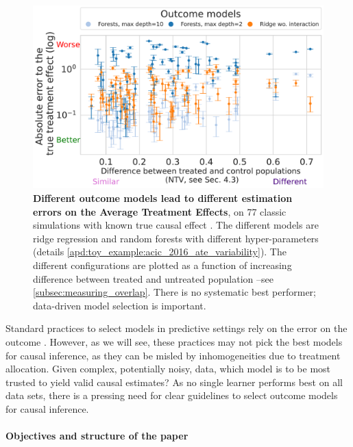 \documentclass[10pt]{article}
\begin{document}
\begin{multicols}{2}
    \begin{figure}
        \centering
        \includegraphics[width=0.95\linewidth]{images/2023-03-08-11-10-28_acic_2016_ate_heterogeneity.parquet_abs_bias_ylog_scale=True.pdf}%
        \caption{\textbf{Different outcome models lead to different
                estimation errors on the Average Treatment Effects},
            on 77 classic simulations with known true causal effect
            \cite{dorie_automated_2019}. The different models are ridge regression
            and random forests with different hyper-parameters
            (details
            \ref{apd:toy_example:acic_2016_ate_variability}). The different configurations are
            plotted as a function of increasing difference between treated and
            untreated population --see
            \autoref{subsec:measuring_overlap}.
            There is no systematic best performer; data-driven model
            selection is important.
            \label{fig:acic_2016_ate_heterogeneity}%
        }
    \end{figure}

    Standard practices to select models in predictive settings rely on
    the error on the outcome
    \cite{poldrack2020establishment,varoquaux2022evaluating}. However, as we
    will see, these practices may not pick the best models
    for causal inference, as they can be misled by inhomogeneities due to
    treatment allocation.
    Given complex, potentially noisy, data, which model is to be most trusted to
    yield valid causal estimates? As no single learner performs
    best on all data sets, there is a pressing need for clear guidelines to select
    outcome models for causal inference.

    \paragraph{Objectives and structure of the paper}


\end{multicols}
\end{document}
